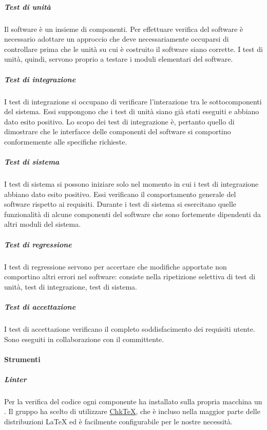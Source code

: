 \documentclass[../norme-di-progetto.tex]{subfiles}
\begin{document}
\subparagraph{Test di unità}%
\label{subp:test_di_unita}
Il software è un insieme di componenti. Per effettuare verifica del software è necessario adottare un approccio  che deve necessariamente occuparsi di controllare prima che le unità su cui è costruito il software siano corrette. I test di unità, quindi, servono proprio a testare i moduli elementari del software.

\subparagraph{Test di integrazione}%
\label{subp:test_di_integrazione}
I test di integrazione si occupano di verificare l'interazione tra le sottocomponenti del sistema. Essi suppongono che i test di unità siano già stati eseguiti e abbiano dato esito positivo. Lo scopo dei test di integrazione è, pertanto quello di dimostrare che le interfacce delle componenti del software si comportino conformemente alle specifiche richieste.

\subparagraph{Test di sistema}%
\label{test_di_sistemaa}
I test di sistema si possono iniziare solo nel momento in cui i test di integrazione abbiano dato esito positivo. Essi verificano il comportamento generale del software rispetto ai requisiti. Durante i test di sistema si esercitano quelle funzionalità di alcune componenti del software che sono fortemente dipendenti da altri moduli del sistema.

\subparagraph{Test di regressione}%
\label{test_di_regressione}
I test di regressione servono per accertare che modifiche apportate non comportino altri errori nel software: consiste nella ripetizione selettiva di test di unità, test di integrazione, test di sistema.

\subparagraph{Test di accettazione}%
\label{test_di_accettazione}
I test di accettazione verificano il completo soddisfacimento dei requisiti utente. Sono eseguiti in collaborazione con il committente.

\paragraph{Strumenti}%
\label{par:verifica/descrizione/strumenti}

\subparagraph{Linter}%
\label{subp:linter}

Per la verifica del codice ogni componente ha installato sulla propria macchina un . Il gruppo ha scelto di utilizzare \href{https://www.nongnu.org/chktex/}{Chk\TeX}, che è incluso nella maggior parte delle distribuzioni \LaTeX{} ed è facilmente configurabile per le nostre necessità.

\end{document}
